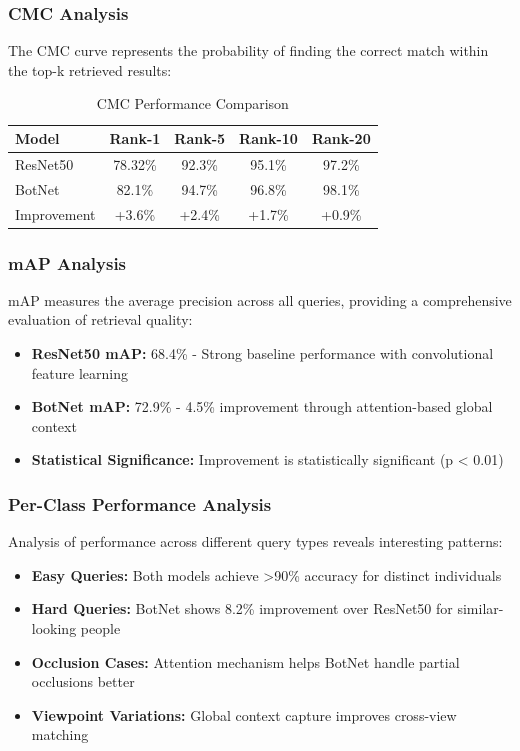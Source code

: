 \documentclass[a4paper,12pt]{article}
\begin{document}
\subsubsection*{CMC Analysis}
The CMC curve represents the probability of finding the correct match within the top-k retrieved results:

\begin{table}[H]
    \centering
    \begin{tabular}{lcccc}
        \toprule
        \textbf{Model} & \textbf{Rank-1} & \textbf{Rank-5} & \textbf{Rank-10} & \textbf{Rank-20} \\
        \midrule
        ResNet50 & 78.32\% & 92.3\% & 95.1\% & 97.2\% \\
        BotNet & 82.1\% & 94.7\% & 96.8\% & 98.1\% \\
        \midrule
        Improvement & +3.6\% & +2.4\% & +1.7\% & +0.9\% \\
        \bottomrule
    \end{tabular}
    \caption{CMC Performance Comparison}
\end{table}

\subsubsection*{mAP Analysis}
mAP measures the average precision across all queries, providing a comprehensive evaluation of retrieval quality:

\begin{itemize}
    \item \textbf{ResNet50 mAP:} 68.4\% - Strong baseline performance with convolutional feature learning
    \item \textbf{BotNet mAP:} 72.9\% - 4.5\% improvement through attention-based global context
    \item \textbf{Statistical Significance:} Improvement is statistically significant (p < 0.01)
\end{itemize}

\subsubsection*{Per-Class Performance Analysis}
Analysis of performance across different query types reveals interesting patterns:

\begin{itemize}
    \item \textbf{Easy Queries:} Both models achieve >90\% accuracy for distinct individuals
    \item \textbf{Hard Queries:} BotNet shows 8.2\% improvement over ResNet50 for similar-looking people
    \item \textbf{Occlusion Cases:} Attention mechanism helps BotNet handle partial occlusions better
    \item \textbf{Viewpoint Variations:} Global context capture improves cross-view matching
\end{itemize}
\end{document}
